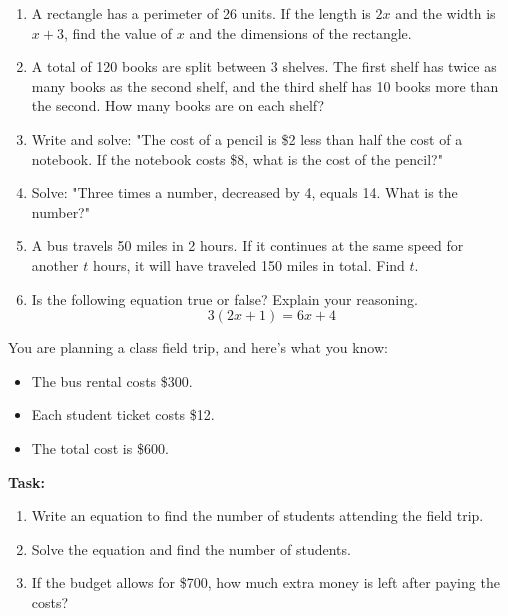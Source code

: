 \documentclass[12pt]{article}
\begin{document}
\begin{tcolorbox}[colframe=black!60, colback=white, 
coltitle=black, colbacktitle=black!15, fonttitle=\bfseries\Large, 
title=Problems, halign title=center, left=10pt, right=10pt, top=10pt, bottom=60pt]
\begin{enumerate}[start=9, itemsep=5em]
    \item A rectangle has a perimeter of 26 units. If the length is \(2x\) and the width is \(x + 3\), find the value of \(x\) and the dimensions of the rectangle.
    \item A total of 120 books are split between 3 shelves. The first shelf has twice as many books as the second shelf, and the third shelf has 10 books more than the second. How many books are on each shelf?
    \item Write and solve: "The cost of a pencil is \$2 less than half the cost of a notebook. If the notebook costs \$8, what is the cost of the pencil?"
    \item Solve: "Three times a number, decreased by 4, equals 14. What is the number?"
    \item A bus travels 50 miles in 2 hours. If it continues at the same speed for another \(t\) hours, it will have traveled 150 miles in total. Find \(t\).
    \item Is the following equation true or false? Explain your reasoning.
    \[
    3(2x + 1) = 6x + 4
    \]
\end{enumerate}
\end{tcolorbox}

\vspace{1em}

\begin{tcolorbox}[colframe=black!60, colback=white, 
coltitle=black, colbacktitle=black!15, fonttitle=\bfseries\Large, 
title=Performance Task: Solving a Budget Problem, halign title=center, left=10pt, right=10pt, top=10pt, bottom=50pt]
You are planning a class field trip, and here’s what you know:
\begin{itemize}
    \item The bus rental costs \$300.
    \item Each student ticket costs \$12.
    \item The total cost is \$600.
\end{itemize}
\textbf{Task:}
\begin{enumerate}[itemsep=3em]
    \item Write an equation to find the number of students attending the field trip.
    \item Solve the equation and find the number of students.
    \item If the budget allows for \$700, how much extra money is left after paying the costs?
\end{enumerate}
\end{tcolorbox}
\end{document}
